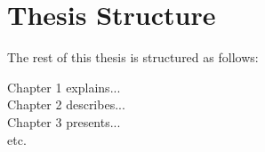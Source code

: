 
\section{Thesis Structure}
The rest of this thesis is structured as follows: 


Chapter 1 explains... \\
Chapter 2 describes... \\
Chapter 3 presents... \\
etc.
